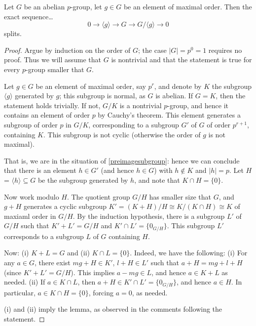 \begin{lemma}
\label{sequenceabeliangroups}
Let $G$ be an abelian $p$-group, let $g \in G$ be an element of maximal order. Then the exact sequence\dots
$$0 \rightarrow \langle g \rangle \rightarrow G \rightarrow G / \langle g \rangle \rightarrow 0$$
splits.
\end{lemma}

\begin{proof}
Argue by induction on the order of $G$; the case $|G| = p^0 = 1$ requires no proof. Thus we will assume that $G$ is nontrivial and that the statement is true for every $p$-group smaller that $G$.

Let $g \in G$ be an element of maximal order, say $p^r$, and denote by $K$ the subgroup $\langle g \rangle$ generated by $g$; this subgroup is normal, as $G$ is abelian. If $G = K$, then the statement
holds trivially. If not, $G/K$ is a nontrivial $p$-group, and hence it contains an element of order $p$ by Cauchy's theorem. This element generates a subgroup of order $p$ in $G/K$, corresponding to a subgroup $G'$
of $G$ of order $p^{r+1}$, containing $K$. This subgroup is not cyclic (otherwise the order of $g$ is not maximal).

That is, we are in the situation of \ref{preimagesubgroup}: hence we can conclude that there is an element $h \in G'$ (and hence $h \in G$) with $h \not \in K$ and $|h| = p$. Let $H$ = $\langle h \rangle \subseteq G$
be the subgroup generated by $h$, and note that $K \cap H = \{ 0 \}$.

Now work modulo $H$. The quotient group $G/H$ has smaller size that $G$, and $g + H$ generates a cyclic subgroup $K' = (K + H)/H \cong K/(K \cap H) \cong K$ of maxiaml order in $G/H$. By the induction hypothesis, there
is a subgroup $L'$ of $G/H$ such that $K' + L' = G/H$ and $K' \cap L' = \{ 0_{G/H} \}$. This subgroup $L'$ corresponds to a subgroup $L$ of $G$ containing $H$.

Now: (i) $K + L = G$ and (ii) $K \cap L = \{ 0 \}$. Indeed, we have the following:
(i) For any $a \in G$, there exist $mg + H \in K'$, $l + H \in L'$ such that $a + H = mg + l + H$ (since $K' + L' = G/H$). This implies $a - mg \in L$, and hence $a \in K + L$ as needed.
(ii) If $a \in K \cap L$, then $a + H \in K' \cap L' = \{ 0_{G/H} \}$, and hence $a \in H$. In particular, $a \in K \cap H = \{ 0 \}$, forcing $a = 0$, as needed.

(i) and (ii) imply the lemma, as observed in the comments following the statement.
\end{proof}

